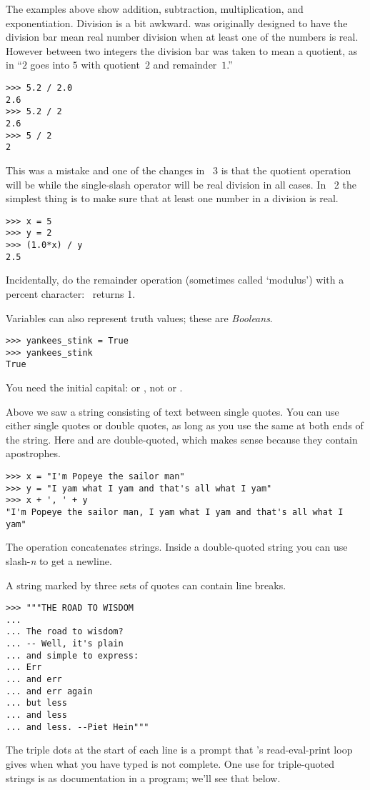 The examples above show addition, subtraction, multiplication, 
and exponentiation. 
Division is a bit awkward.
\python{} was originally designed to have the division bar
\inlinecode{/} mean real number division 
when at least one of the numbers is real.
However between two integers the division bar was taken to mean 
a quotient, as in ``$2$ goes into $5$ with quotient~$2$ and remainder~$1$.''
\begin{lstlisting}[style=python]
>>> 5.2 / 2.0
2.6
>>> 5.2 / 2
2.6
>>> 5 / 2
2
\end{lstlisting}
This was a mistake and one of the changes in \python~3
is that the quotient operation will be \inlinecode{//}
while the single-slash operator will be real division in all cases.
In \python~2 the simplest thing is to make sure that at least one
number in a division is real.
\begin{lstlisting}[style=python]
>>> x = 5
>>> y = 2
>>> (1.0*x) / y
2.5
\end{lstlisting}
Incidentally, do the remainder operation (sometimes called `modulus')  
with a percent character:~ returns 1.

Variables can also represent truth values; these are \textit{Booleans}.
\begin{lstlisting}[style=python]
>>> yankees_stink = True
>>> yankees_stink
True
\end{lstlisting}
You need the initial capital:
or , not
or .
 
Above we saw a string consisting of text between single quotes.
You can use either single quotes or double quotes, as long as you use
the same at both ends of the string. 
Here  and 
are double-quoted, which makes sense because they contain apostrophes. 
\begin{lstlisting}[style=python]
>>> x = "I'm Popeye the sailor man"
>>> y = "I yam what I yam and that's all what I yam"
>>> x + ', ' + y
"I'm Popeye the sailor man, I yam what I yam and that's all what I yam"
\end{lstlisting}
The \inlinecode{+} operation concatenates strings.
Inside a double-quoted string you can use slash-\textit{n} \inlinecode{\\n} to
get a newline.

A string marked by three sets of quotes can contain line breaks.
\begin{lstlisting}[style=python]
>>> """THE ROAD TO WISDOM
... 
... The road to wisdom?
... -- Well, it's plain
... and simple to express:
... Err
... and err
... and err again
... but less
... and less
... and less. --Piet Hein"""
\end{lstlisting}
The triple dots at the start of each line is a prompt that \python's
read-eval-print loop gives when what you have typed is not complete.
One use for triple-quoted strings is as documentation in a program;
we'll see that below.

